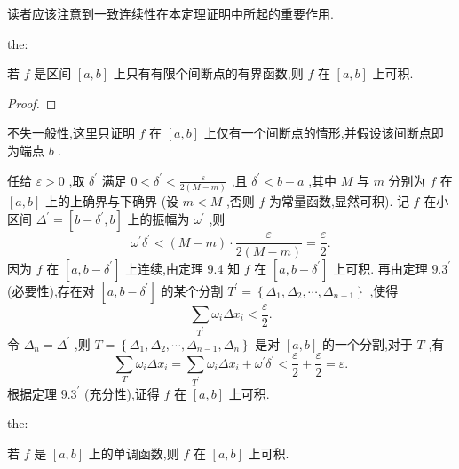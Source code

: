 读者应该注意到一致连续性在本定理证明中所起的重要作用.

\begin{theorem}{}{the:}

\end{theorem}
 若 \(f\) 是区间 \(\left\lbrack  {a,b}\right\rbrack\) 上只有有限个间断点的有界函数,则 \(f\) 在 \(\left\lbrack  {a,b}\right\rbrack\) 上可积.

\begin{proof}

\end{proof}
不失一般性,这里只证明 \(f\) 在 \(\left\lbrack  {a,b}\right\rbrack\) 上仅有一个间断点的情形,并假设该间断点即为端点 \(b\) .

任给 \(\varepsilon  > 0\) ,取 \({\delta }^{\prime }\) 满足 \(0 < {\delta }^{\prime } < \frac{\varepsilon }{2\left( {M - m}\right) }\) ,且 \({\delta }^{\prime } < b - a\) ,其中 \(M\) 与 \(m\) 分别为 \(f\) 在 \(\left\lbrack  {a,b}\right\rbrack\) 上的上确界与下确界 (设 \(m < M\) ,否则 \(f\) 为常量函数,显然可积). 记 \(f\) 在小区间 \({\Delta }^{\prime } = \left\lbrack  {b - {\delta }^{\prime },b}\right\rbrack\) 上的振幅为 \({\omega }^{\prime }\) ,则
\[
{\omega }^{\prime }{\delta }^{\prime } < \left( {M - m}\right)  \cdot  \frac{\varepsilon }{2\left( {M - m}\right) } = \frac{\varepsilon }{2}.
\]
因为 \(f\) 在 \(\left\lbrack  {a,b - {\delta }^{\prime }}\right\rbrack\) 上连续,由定理 9.4 知 \(f\) 在 \(\left\lbrack  {a,b - {\delta }^{\prime }}\right\rbrack\) 上可积. 再由定理 \({9.3}^{\prime }\) (必要性),存在对 \(\left\lbrack  {a,b - {\delta }^{\prime }}\right\rbrack\) 的某个分割 \({T}^{\prime } = \left\{  {{\Delta }_{1},{\Delta }_{2},\cdots ,{\Delta }_{n - 1}}\right\}\) ,使得
\[
\mathop{\sum }\limits_{{T}^{\prime }}{\omega }_{i}\Delta {x}_{i} < \frac{\varepsilon }{2}.
\]
令 \({\Delta }_{n} = {\Delta }^{\prime }\) ,则 \(T = \left\{  {{\Delta }_{1},{\Delta }_{2},\cdots ,{\Delta }_{n - 1},{\Delta }_{n}}\right\}\) 是对 \(\left\lbrack  {a,b}\right\rbrack\) 的一个分割,对于 \(T\) ,有
\[
\mathop{\sum }\limits_{T}{\omega }_{i}\Delta {x}_{i} = \mathop{\sum }\limits_{{T}^{\prime }}{\omega }_{i}\Delta {x}_{i} + {\omega }^{\prime }{\delta }^{\prime } < \frac{\varepsilon }{2} + \frac{\varepsilon }{2} = \varepsilon .
\]
根据定理 \({9.3}^{\prime }\) (充分性),证得 \(f\) 在 \(\left\lbrack  {a,b}\right\rbrack\) 上可积.

\begin{theorem}{}{the:}

\end{theorem}
 若 \(f\) 是 \(\left\lbrack  {a,b}\right\rbrack\) 上的单调函数,则 \(f\) 在 \(\left\lbrack  {a,b}\right\rbrack\) 上可积.

